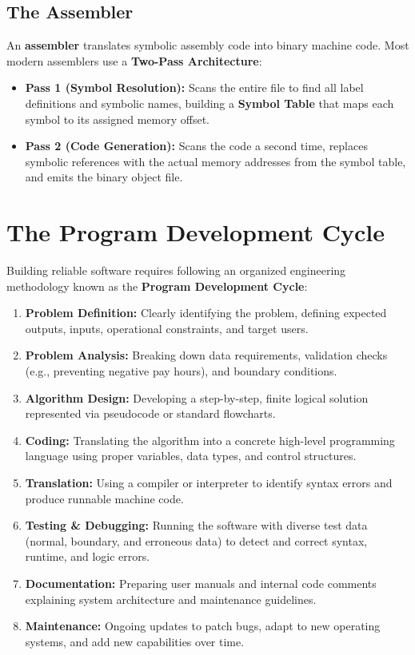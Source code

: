 \subsection{The Assembler}
An \textbf{assembler} translates symbolic assembly code into binary machine code. Most modern assemblers use a \textbf{Two-Pass Architecture}:
\begin{itemize}[leftmargin=1.2em]
    \item \textbf{Pass 1 (Symbol Resolution):} Scans the entire file to find all label definitions and symbolic names, building a \textbf{Symbol Table} that maps each symbol to its assigned memory offset.
    \item \textbf{Pass 2 (Code Generation):} Scans the code a second time, replaces symbolic references with the actual memory addresses from the symbol table, and emits the binary object file.
\end{itemize}

\section{The Program Development Cycle}

Building reliable software requires following an organized engineering methodology known as the \textbf{Program Development Cycle}:

\begin{enumerate}[leftmargin=1.5em]
    \item \textbf{Problem Definition:} Clearly identifying the problem, defining expected outputs, inputs, operational constraints, and target users.
    \item \textbf{Problem Analysis:} Breaking down data requirements, validation checks (e.g., preventing negative pay hours), and boundary conditions.
    \item \textbf{Algorithm Design:} Developing a step-by-step, finite logical solution represented via pseudocode or standard flowcharts.
    \item \textbf{Coding:} Translating the algorithm into a concrete high-level programming language using proper variables, data types, and control structures.
    \item \textbf{Translation:} Using a compiler or interpreter to identify syntax errors and produce runnable machine code.
    \item \textbf{Testing \& Debugging:} Running the software with diverse test data (normal, boundary, and erroneous data) to detect and correct syntax, runtime, and logic errors.
    \item \textbf{Documentation:} Preparing user manuals and internal code comments explaining system architecture and maintenance guidelines.
    \item \textbf{Maintenance:} Ongoing updates to patch bugs, adapt to new operating systems, and add new capabilities over time.
\end{enumerate}

